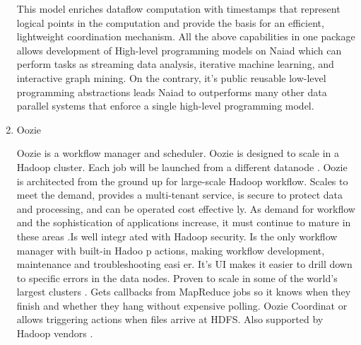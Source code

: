 \begin{enumerate}
This model enriches dataflow computation with timestamps that
represent logical points in the computation and provide the basis
for an efficient, lightweight coordination mechanism.  All the
above capabilities in one package allows development of High-level
programming models on Naiad which can perform tasks as streaming
data analysis, iterative machine learning, and interactive graph
mining. On the contrary, it's public reusable low-level
programming abstractions leads Naiad to outperforms many other
data parallel systems that enforce a single high-level programming
model.

\item {} 
Oozie

Oozie is a workflow manager and scheduler. Oozie is designed to
scale in a Hadoop cluster. Each job will be launched from a
different datanode \label{\detokenize{i524/technologies:id33}}{\hyperref[\detokenize{i524/technologies:paper-oozie}]{\sphinxcrossref{{[}31{]}}}} \label{\detokenize{i524/technologies:id34}}{\hyperref[\detokenize{i524/technologies:www-oozie1}]{\sphinxcrossref{{[}32{]}}}}.  Oozie
\label{\detokenize{i524/technologies:id35}}{\hyperref[\detokenize{i524/technologies:www-oozie2}]{\sphinxcrossref{{[}33{]}}}} is architected from the ground up for
large-scale Hadoop workflow. Scales to meet the demand, provides a
multi-tenant service, is secure to protect data and processing,
and can be operated cost effective ly. As demand for workflow and
the sophistication of applications increase, it must continue to
mature in these areas \label{\detokenize{i524/technologies:id36}}{\hyperref[\detokenize{i524/technologies:paper-oozie}]{\sphinxcrossref{{[}31{]}}}}.Is well integr ated with
Hadoop security. Is the only workflow manager with built-in Hadoo
p actions, making workflow development, maintenance and
troubleshooting easi er. It’s UI makes it easier to drill down to
specific errors in the data nodes. Proven to scale in some of the
world’s largest clusters \label{\detokenize{i524/technologies:id37}}{\hyperref[\detokenize{i524/technologies:paper-oozie}]{\sphinxcrossref{{[}31{]}}}}. Gets callbacks from
MapReduce jobs so it knows when they finish and whether they hang
without expensive polling. Oozie Coordinat or allows triggering
actions when files arrive at HDFS. Also supported by Hadoop
vendors \label{\detokenize{i524/technologies:id38}}{\hyperref[\detokenize{i524/technologies:paper-oozie}]{\sphinxcrossref{{[}31{]}}}}.


\end{enumerate}
